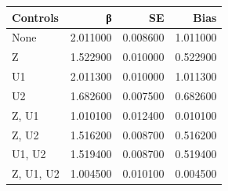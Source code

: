 \begin{tabular}{lrrr}
\toprule
Controls & β & SE & Bias \\
\midrule
None & 2.011000 & 0.008600 & 1.011000 \\
Z & 1.522900 & 0.010000 & 0.522900 \\
U1 & 2.011300 & 0.010000 & 1.011300 \\
U2 & 1.682600 & 0.007500 & 0.682600 \\
Z, U1 & 1.010100 & 0.012400 & 0.010100 \\
Z, U2 & 1.516200 & 0.008700 & 0.516200 \\
U1, U2 & 1.519400 & 0.008700 & 0.519400 \\
Z, U1, U2 & 1.004500 & 0.010100 & 0.004500 \\
\bottomrule
\end{tabular}

